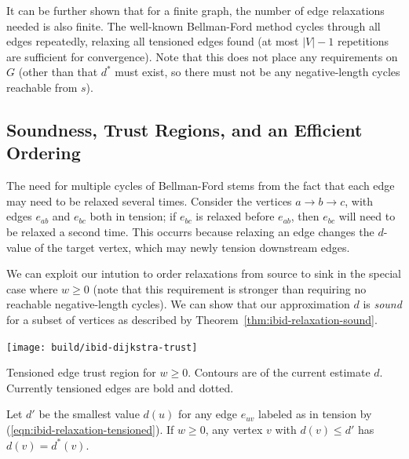 It can be further shown that for a finite graph,
the number of edge relaxations needed is also finite.
The well-known Bellman-Ford method
\citep{shimbel1955communicationnets, bellman1958routing,
moore1959spmaze}
cycles through all edges repeatedly,
relaxing all tensioned edges found
(at most $|V|-1$ repetitions are sufficient for convergence).
Note that this does not place any requirements on $G$
(other than that $d^*$ must exist, so there must not be
any negative-length cycles reachable from $s$).

\subsection{Soundness, Trust Regions, and an Efficient Ordering}

The need for multiple cycles of Bellman-Ford stems from the fact
that each edge may need to be relaxed several times.
Consider the vertices $a \rightarrow b \rightarrow c$,
with edges $e_{ab}$ and $e_{bc}$ both in tension;
if $e_{bc}$ is relaxed before $e_{ab}$,
then $e_{bc}$ will need to be relaxed a second time.
This occurrs because relaxing an edge changes the
$d$-value of the target vertex,
which may newly tension downstream edges.

We can exploit our intution to order relaxations from source to sink
in the special case where $w \geq 0$
(note that this requirement is stronger than requiring no reachable
negative-length cycles).
We can show that our approximation $d$
is \emph{sound} for a subset of vertices
as described by Theorem~\ref{thm:ibid-relaxation-sound}.

\begin{marginfigure}
   \centering
   \texttt{[image: build/ibid-dijkstra-trust]}
   \caption{Tensioned edge trust region
      for $w \geq 0$.
      Contours are of the current estimate $d$.
      Currently tensioned edges are bold and dotted.}
\end{marginfigure}

\begin{theorem}
Let $d'$ be the smallest value $d(u)$
for any edge $e_{uv}$ labeled as in tension
by (\ref{eqn:ibid-relaxation-tensioned}).
If $w \geq 0$,
any vertex $v$ with $d(v) \leq d'$
has $d(v) = d^*(v)$.
\label{thm:ibid-relaxation-sound}
\end{theorem}

